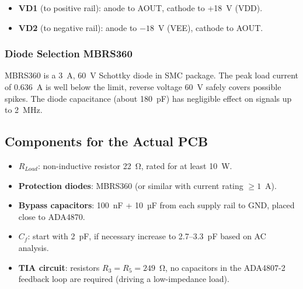 \documentclass[a4paper, 12pt]{article}
\begin{document}
\begin{itemize}
  \item \textbf{VD1} (to positive rail): anode to AOUT,
        cathode to +18~V (VDD).
  \item \textbf{VD2} (to negative rail): anode to $-18$~V
        (VEE), cathode to AOUT.
\end{itemize}

\subsubsection{Diode Selection MBRS360}
MBRS360 \cite{MBRS360_ds} is a 3~A, 60~V Schottky diode in SMC package.
The peak load current of 0.636~A is well below the limit, reverse voltage
60~V safely covers possible spikes. The diode capacitance (about 180~pF) has
negligible effect on signals up to 2~MHz.

\subsection{Components for the Actual PCB}

\begin{itemize}
  \item \textbf{\(R_{Load}\)}: non-inductive resistor 22~Ω,
        rated for at least 10~W.
  \item \textbf{Protection diodes}: MBRS360 (or similar with current rating \(\ge 1\)~A).
  \item \textbf{Bypass capacitors}: 100~nF + 10~µF
        from each supply rail to GND, placed close to ADA4870.
  \item \textbf{\(C_f\)}: start with 2~pF, if necessary
        increase to 2.7–3.3~pF based on AC analysis.
  \item \textbf{TIA circuit}: resistors \(R_3=R_5=249\)~Ω,
        no capacitors in the ADA4807-2 feedback loop are required
        (driving a low-impedance load).
\end{itemize}
\end{document}
